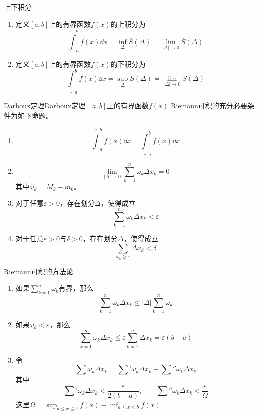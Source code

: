 \documentclass[lang = cn, scheme = chinese, thmcnt = section]{elegantbook}
\begin{document}
\begin{definition}{上下积分}
	\begin{enumerate}
		\item 定义$[a,b]$上的有界函数$f(x)$的上积分为
		$$
		\overline{\int}_{a}^{b}f(x)\dd x=\inf_{\Delta}\overline{S}(\Delta)=\lim_{|\Delta|\to 0}\overline{S}(\Delta)
		$$
		\item 定义$[a,b]$上的有界函数$f(x)$的下积分为
		$$
		\underline{\int}_{a}^{b}f(x)\dd x=\sup_{\Delta}\underline{S}(\Delta)=\lim_{|\Delta|\to 0}\underline{S}(\Delta)
		$$
	\end{enumerate}
\end{definition}

\begin{theorem}{Darboux定理}{Darboux定理}
	$[a,b]$上的有界函数$f(x)$ Riemann可积的充分必要条件为如下命题。
	\begin{enumerate}
		\item 
		$$
		\overline{\int}_{a}^{b}f(x)\dd x=\underline{\int}_{a}^{b}f(x)\dd x
		$$
		\item 
		$$
		\lim_{|\Delta|\to 0}\sum_{k=1}^{n}\omega_k\Delta x_k=0
		$$
		其中$\omega_k=M_k-m_k$。
		\item 对于任意$\varepsilon>0$，存在划分$\Delta$，使得成立
		$$
		\sum_{k=1}^{n}\omega_k\Delta x_k<\varepsilon
		$$
		\item 对于任意$\varepsilon>0$与$\delta>0$，存在划分$\Delta$，使得成立
		$$
		\sum_{\omega_k\ge\varepsilon}\Delta x_k<\delta
		$$
	\end{enumerate}
\end{theorem}

\begin{theorem}{Riemann可积的方法论}
	\begin{enumerate}
		\item 如果$\displaystyle \sum_{k=1}^{n}\omega_k$有界，那么
		$$
		\sum_{k=1}^{n}\omega_k\Delta x_k\le
		|\Delta|\sum_{k=1}^{n}\omega_k
		$$
		\item 如果$\omega_k<\varepsilon$，那么
		$$
		\sum_{k=1}^{n}\omega_k\Delta x_k\le
		\varepsilon\sum_{k=1}^{n}\Delta x_k
		=\varepsilon(b-a)
		$$
		\item 令
		$$
		\sum \omega_k\Delta x_k
		=\sum' \omega_k\Delta x_k+\sum'' \omega_k\Delta x_k
		$$
		其中
		$$
		\sum' \omega_k\Delta x_k<\frac{\varepsilon}{2(b-a)},\qquad 
		\sum'' \omega_k\Delta x_k<\frac{\varepsilon}{\Omega}
		$$
		这里$\displaystyle \Omega=\sup_{a\le x\le b}f(x)-\inf_{a\le x\le b}f(x)$
	\end{enumerate}
\end{theorem}
\end{document}
